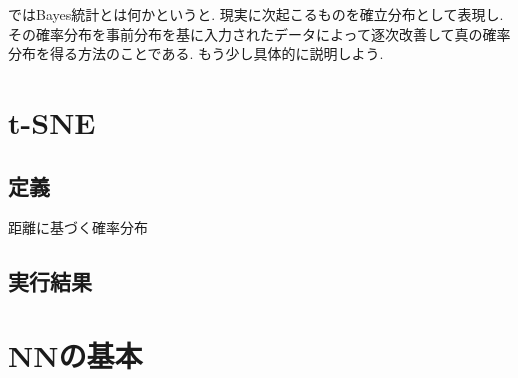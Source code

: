 \documentclass{ujarticle}
\begin{document}
ではBayes統計とは何かというと.
現実に次起こるものを確立分布として表現し.
その確率分布を事前分布を基に入力されたデータによって逐次改善して真の確率分布を得る方法のことである.
もう少し具体的に説明しよう.




\section{t-SNE}
\label{sec:t-SNE}
\subsection{定義}
\label{sub:定義}
距離に基づく確率分布

\subsection{実行結果}
\label{sub:実行結果}

\section{NNの基本}
\label{sec:NNの基本}
\end{document}
